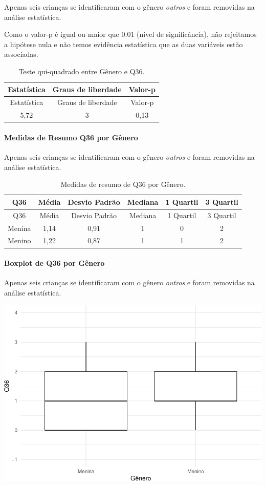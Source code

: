 \documentclass[]{article}
\let\oldparagraph\paragraph
\renewcommand{\paragraph}[1]{\oldparagraph{#1}\mbox{}}
\begin{document}
Apenas seis crianças se identificaram com o gênero \emph{outros} e foram removidas na análise estatística.

Como o valor-p é igual ou maior que 0.01 (nível de significância), não rejeitamos a hipótese nula e não temos evidência estatística que as duas variáveis estão associadas.

\begin{longtable}[]{@{}ccc@{}}
\caption{\label{tab:unnamed-chunk-1323}Teste qui-quadrado entre Gênero e Q36.}\tabularnewline
\toprule
Estatística & Graus de liberdade & Valor-p\tabularnewline
\midrule
\endfirsthead
\toprule
Estatística & Graus de liberdade & Valor-p\tabularnewline
\midrule
\endhead
5,72 & 3 & 0,13\tabularnewline
\bottomrule
\end{longtable}

\cleardoublepage

\hypertarget{medidas-de-resumo-q36-por-guxeanero}{%
\paragraph{Medidas de Resumo Q36 por Gênero}\label{medidas-de-resumo-q36-por-guxeanero}}

Apenas seis crianças se identificaram com o gênero \emph{outros} e foram removidas na análise estatística.

\begin{longtable}[]{@{}cccccc@{}}
\caption{\label{tab:unnamed-chunk-1324}Medidas de resumo de Q36 por Gênero.}\tabularnewline
\toprule
Q36 & Média & Desvio Padrão & Mediana & 1 Quartil & 3 Quartil\tabularnewline
\midrule
\endfirsthead
\toprule
Q36 & Média & Desvio Padrão & Mediana & 1 Quartil & 3 Quartil\tabularnewline
\midrule
\endhead
Menina & 1,14 & 0,91 & 1 & 0 & 2\tabularnewline
Menino & 1,22 & 0,87 & 1 & 1 & 2\tabularnewline
\bottomrule
\end{longtable}

\hypertarget{boxplot-de-q36-por-guxeanero}{%
\paragraph{Boxplot de Q36 por Gênero}\label{boxplot-de-q36-por-guxeanero}}

Apenas seis crianças se identificaram com o gênero \emph{outros} e foram removidas na análise estatística.

\begin{center}\includegraphics[width=0.75\linewidth]{relatorio_covid19_files/figure-latex/unnamed-chunk-1325-1} \end{center}
\end{document}
